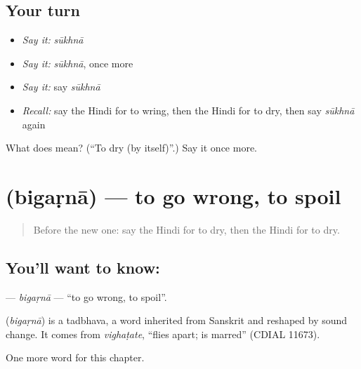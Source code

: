 \subsection*{Your turn}
\begin{itemize}
\raggedright
  \item \emph{Say it:} \emph{sūkhnā}
  \item \emph{Say it:} \emph{sūkhnā}, once more
  \item \emph{Say it:} say \emph{sūkhnā}
  \item \emph{Recall:} say the Hindi for to wring, then the Hindi for to dry, then say \emph{sūkhnā} again
\end{itemize}

\begin{tcolorbox}[breakable,colback=teal!4,colframe=teal!35!black,title={Before you move on}]
What does  mean? (\textquotedblleft{}To dry (by itself)\textquotedblright{}.) Say it once more.
\end{tcolorbox}
\section[\texorpdfstring{\hi{बिगड़ना} (bigaṛnā)}{बिगड़ना (bigaṛnā)}]{ (bigaṛnā) — to go wrong, to spoil}

\label{lesson:HI-C226-bigarna}



\begin{quote}
Before the new one: say the Hindi for to dry, then the Hindi for to dry.
\end{quote}

\subsection*{You'll want to know: }
\textbf{} — \emph{bigaṛnā} — \textquotedblleft{}to go wrong, to spoil\textquotedblright{}.

\begin{cousinweb}
\textbf{} (\emph{bigaṛnā}) is a tadbhava, a word inherited from Sanskrit and reshaped by sound change. It comes from \emph{vighaṭate}, \textquotedblleft{}flies apart; is marred\textquotedblright{} (CDIAL 11673).
\end{cousinweb}

\begin{grammarlens}[title={What you've built}]
One more word for this chapter.
\end{grammarlens}

